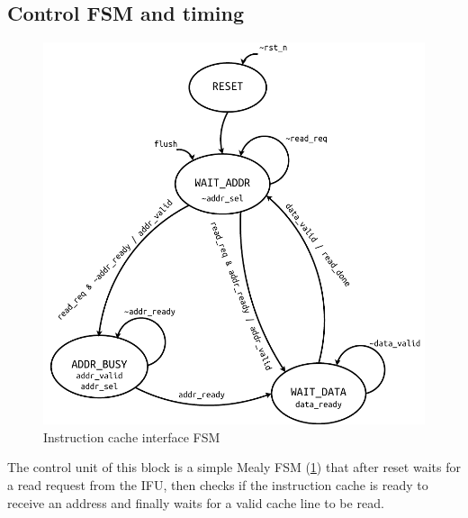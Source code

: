 \subsection{Control \acs{FSM} and timing}
\begin{figure}[hbt]
  \centering
  \includegraphics[scale=.8]{img/icache_ifc_fsm.pdf}
  \caption{Instruction cache interface \acs{FSM}}
  \label{fig:icache_ifc_fsm}
\end{figure}
The control unit of this block is a simple Mealy \acs{FSM} (\cref{fig:icache_ifc_fsm}) that after reset waits for a read request from the \ac{IFU}, then checks if the instruction cache is ready to receive an address and finally waits for a valid cache line to be read.

